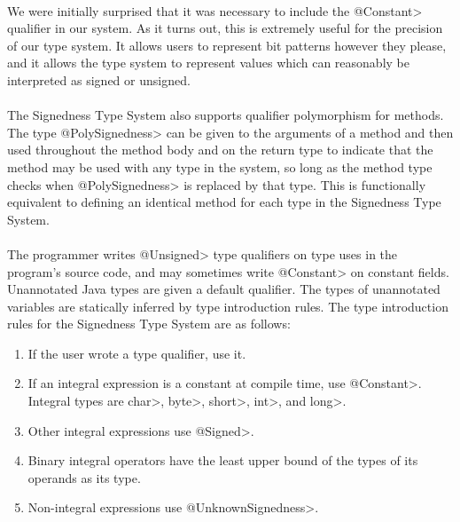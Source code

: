 \noindent\\
We were initially surprised that it was necessary to include the \<@Constant>
qualifier in our system. As it turns out, this is extremely useful for the
precision of our type system. It allows users to represent bit patterns
however they please, and it allows the type system to represent values which can
reasonably be interpreted as signed or unsigned.\\
\\
The Signedness Type System also supports qualifier polymorphism for methods.
The type \<@PolySignedness> can be given to the arguments of a method and then
used throughout the method body and on the return type to indicate that the
method may be used with any type in the system, so long as the method type
checks when \<@PolySignedness> is replaced by that type. This is functionally
equivalent to defining an identical method for each type in the Signedness
Type System.\\
\\
The programmer writes \<@Unsigned> type qualifiers on type uses
in the program's source code, and may sometimes write \<@Constant> on
constant fields.  Unannotated Java types
are given a default qualifier. The types of unannotated variables are statically
inferred by type introduction rules. The type introduction rules for the
Signedness Type System are as follows:

\begin{enumerate}
  \item If the user wrote a type qualifier, use it.
  \item If an integral expression is a constant at compile time, use
    \<@Constant>.
    Integral types are \<char>, \<byte>, \<short>, \<int>, and \<long>.
  \item Other integral expressions use \<@Signed>.
  \item Binary integral operators have the least upper bound of the types of
  its operands as its type.
  \item Non-integral expressions use \<@UnknownSignedness>.
\end{enumerate}

